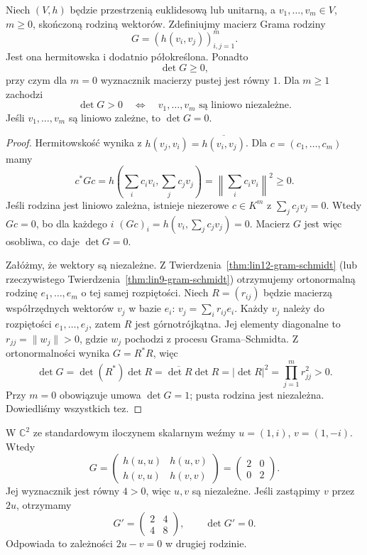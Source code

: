\begin{twierdzenie}
\label{thm:lin12-wyznacznik-grama}
Niech \((V,h)\) będzie przestrzenią
euklidesową lub unitarną,
a \(v_1,\ldots,v_m\in V\), \(m\ge0\),
skończoną rodziną wektorów.
Zdefiniujmy macierz Grama rodziny
\[
 G=(h(v_i,v_j))_{i,j=1}^m.
\]
Jest ona hermitowska i dodatnio
półokreślona. Ponadto
\[
 \det G\ge0,
\]
przy czym dla \(m=0\)
wyznacznik macierzy pustej
jest równy \(1\).
Dla \(m\ge1\) zachodzi
\[
 \det G>0
 \quad\Longleftrightarrow\quad
 v_1,\ldots,v_m
 \text{ są liniowo niezależne}.
\]
Jeśli \(v_1,\ldots,v_m\)
są liniowo zależne, to
\(\det G=0\).
\end{twierdzenie}
\begin{proof}
Hermitowskość wynika
z \(h(v_j,v_i)=\overline{h(v_i,v_j)}\).
Dla \(c=(c_1,\ldots,c_m)\)
mamy
\[
 c^*Gc
 =h\!\left(\sum_i c_iv_i,\sum_jc_jv_j\right)
 =\left\|\sum_i c_iv_i\right\|^2\ge0.
\]
Jeśli rodzina jest liniowo zależna,
istnieje niezerowe \(c\in K^m\)
z \(\sum_j c_jv_j=0\).
Wtedy \(Gc=0\), bo dla każdego \(i\)
\((Gc)_i=h(v_i,\sum_jc_jv_j)=0\).
Macierz \(G\) jest więc osobliwa,
co daje \(\det G=0\).

Załóżmy, że wektory są niezależne.
Z
Twierdzenia~\ref{thm:lin12-gram-schmidt}
(lub rzeczywistego
Twierdzenia~\ref{thm:lin9-gram-schmidt})
otrzymujemy ortonormalną rodzinę
\(e_1,\ldots,e_m\)
o tej samej rozpiętości.
Niech \(R=(r_{ij})\) będzie
macierzą współrzędnych
wektorów \(v_j\) w bazie \(e_i\):
\(v_j=\sum_i r_{ij}e_i\).
Każdy \(v_j\) należy do
rozpiętości \(e_1,\ldots,e_j\),
zatem \(R\) jest górnotrójkątna.
Jej elementy diagonalne
to \(r_{jj}=\|w_j\|>0\),
gdzie \(w_j\) pochodzi
z procesu Grama--Schmidta.
Z ortonormalności wynika
\(G=R^*R\), więc
\[
 \det G
 =\det(R^*)\det R
 =\overline{\det R}\det R
 =|\det R|^2
 =\prod_{j=1}^m r_{jj}^2>0.
\]
Przy \(m=0\) obowiązuje
umowa \(\det G=1\);
pusta rodzina jest niezależna.
Dowiedliśmy wszystkich tez.
\end{proof}

\begin{przyklad}
\label{prz:lin12-gram-dwa}
W \(\mathbb C^2\) ze standardowym
iloczynem skalarnym weźmy
\(u=(1,i)\), \(v=(1,-i)\).
Wtedy
\[
 G=\begin{pmatrix}
   h(u,u)&h(u,v)\\
   h(v,u)&h(v,v)
 \end{pmatrix}
 =\begin{pmatrix}2&0\\0&2\end{pmatrix}.
\]
Jej wyznacznik jest równy \(4>0\),
więc \(u,v\) są niezależne.
Jeśli zastąpimy \(v\) przez \(2u\),
otrzymamy
\[
 G'=\begin{pmatrix}2&4\\4&8\end{pmatrix},
 \qquad\det G'=0.
\]
Odpowiada to zależności \(2u-v=0\)
w drugiej rodzinie.
\end{przyklad}

